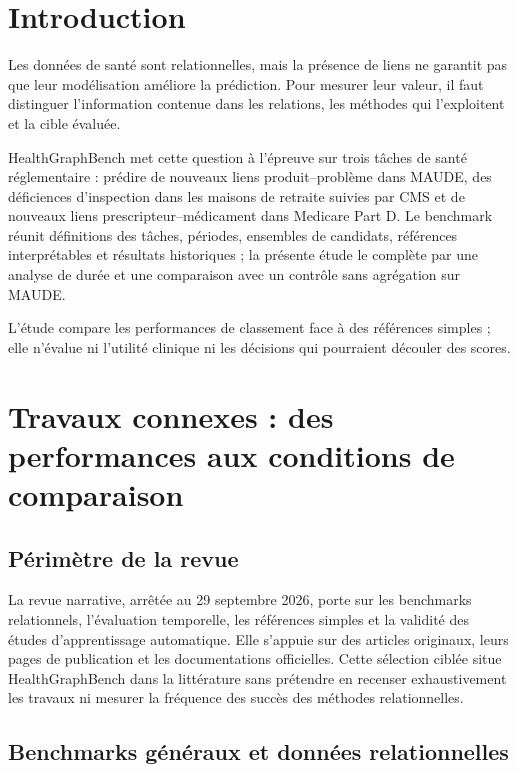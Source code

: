 \section{Introduction}

Les données de santé sont relationnelles, mais la présence de liens ne garantit pas que leur modélisation améliore la prédiction. Pour mesurer leur valeur, il faut distinguer l'information contenue dans les relations, les méthodes qui l'exploitent et la cible évaluée.

HealthGraphBench met cette question à l'épreuve sur trois tâches de santé réglementaire : prédire de nouveaux liens produit--problème dans MAUDE, des déficiences d'inspection dans les maisons de retraite suivies par CMS et de nouveaux liens prescripteur--médicament dans Medicare Part D. Le benchmark réunit définitions des tâches, périodes, ensembles de candidats, références interprétables et résultats historiques ; la présente étude le complète par une analyse de durée et une comparaison avec un contrôle sans agrégation sur MAUDE.

L'étude compare les performances de classement face à des références simples ; elle n'évalue ni l'utilité clinique ni les décisions qui pourraient découler des scores.

\section{Travaux connexes : des performances aux conditions de comparaison}

\subsection{Périmètre de la revue}

La revue narrative, arrêtée au 29 septembre 2026, porte sur les benchmarks relationnels, l'évaluation temporelle, les références simples et la validité des études d'apprentissage automatique. Elle s'appuie sur des articles originaux, leurs pages de publication et les documentations officielles. Cette sélection ciblée situe HealthGraphBench dans la littérature sans prétendre en recenser exhaustivement les travaux ni mesurer la fréquence des succès des méthodes relationnelles.

\subsection{Benchmarks généraux et données relationnelles}

